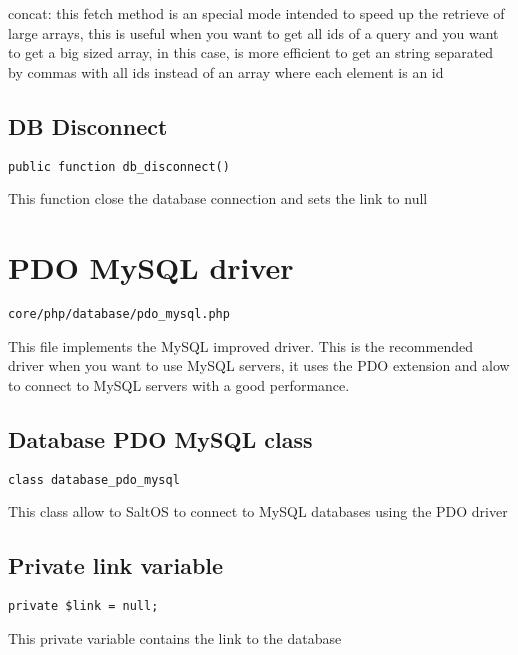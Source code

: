 \documentclass[a4paper]{book}
\begin{document}
concat: this fetch method is an special mode intended to speed up the retrieve of large
arrays, this is useful when you want to get all ids of a query and you want to get a big
sized array, in this case, is more efficient to get an string separated by commas with all
ids instead of an array where each element is an id

\hypertarget{toc329}{}
\subsection{DB Disconnect}

\begin{lstlisting}
public function db_disconnect()
\end{lstlisting}

This function close the database connection and sets the link to null

\hypertarget{toc330}{}
\section{PDO MySQL driver}

\begin{lstlisting}
core/php/database/pdo_mysql.php
\end{lstlisting}

This file implements the MySQL improved driver. This is the recommended driver when you want
to use MySQL servers, it uses the PDO extension and alow to connect to MySQL servers with a
good performance.

\hypertarget{toc331}{}
\subsection{Database PDO MySQL class}

\begin{lstlisting}
class database_pdo_mysql
\end{lstlisting}

This class allow to SaltOS to connect to MySQL databases using the PDO driver

\hypertarget{toc332}{}
\subsection{Private link variable}

\begin{lstlisting}
private $link = null;
\end{lstlisting}

This private variable contains the link to the database
\end{document}
